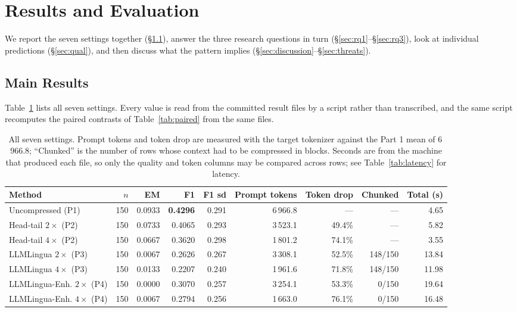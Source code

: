 ﻿\documentclass[10pt,a4paper,twocolumn]{article}
\begin{document}
\section{Results and Evaluation}
\label{sec:results}

We report the seven settings together (\S\ref{sec:main}), answer the three
research questions in turn (\S\ref{sec:rq1}--\S\ref{sec:rq3}), look at individual
predictions (\S\ref{sec:qual}), and then discuss what the pattern implies
(\S\ref{sec:discussion}--\S\ref{sec:threats}).

\subsection{Main Results}
\label{sec:main}

Table~\ref{tab:main} lists all seven settings. Every value is read from the
committed result files by a script rather than transcribed, and the same script
recomputes the paired contrasts of Table~\ref{tab:paired} from the same files.

\begin{table}[t]
\centering
\small
\setlength{\tabcolsep}{5pt}
\begin{tabular}{@{}lrrrrrrrr@{}}
\toprule
Method & $n$ & EM & F1 & F1 sd & Prompt tokens & Token drop & Chunked & Total (s) \\
\midrule
Uncompressed (P1)              & 150 & 0.0933 & \textbf{0.4296} & 0.291 & 6\,966.8 & ---      & ---     & 4.65 \\
Head-tail $2\times$ (P2)       & 150 & 0.0733 & 0.4065 & 0.293 & 3\,523.1 & 49.4\%   & ---     & 5.82 \\
Head-tail $4\times$ (P2)       & 150 & 0.0667 & 0.3620 & 0.298 & 1\,801.2 & 74.1\%   & ---     & 3.55 \\
LLMLingua $2\times$ (P3)       & 150 & 0.0067 & 0.2626 & 0.267 & 3\,308.1 & 52.5\%   & 148/150 & 13.84 \\
LLMLingua $4\times$ (P3)       & 150 & 0.0133 & 0.2207 & 0.240 & 1\,961.6 & 71.8\%   & 148/150 & 11.98 \\
LLMLingua-Enh. $2\times$ (P4)  & 150 & 0.0000 & 0.3070 & 0.257 & 3\,254.1 & 53.3\%   & 0/150   & 19.64 \\
LLMLingua-Enh. $4\times$ (P4)  & 150 & 0.0067 & 0.2794 & 0.256 & 1\,663.0 & 76.1\%   & 0/150   & 16.48 \\
\bottomrule
\end{tabular}
\caption{All seven settings. Prompt tokens and token drop are measured with the
target tokenizer against the Part 1 mean of 6\,966.8; ``Chunked'' is the number of
rows whose context had to be compressed in blocks. Seconds are from the machine
that produced each file, so only the quality and token columns may be compared
across rows; see Table~\ref{tab:latency} for latency.}
\label{tab:main}
\end{table}
\end{document}
